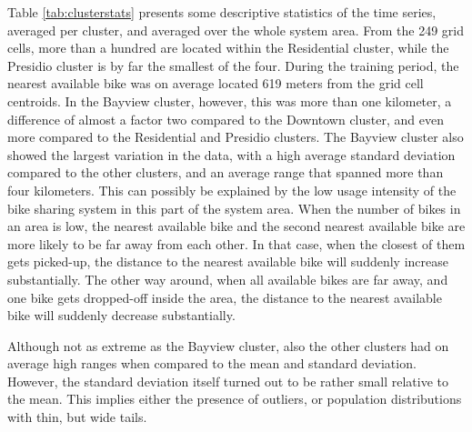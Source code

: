 \documentclass[12pt,oneside]{reedthesis}
\begin{document}
Table \ref{tab:clusterstats} presents some descriptive statistics of the
time series, averaged per cluster, and averaged over the whole system
area. From the 249 grid cells, more than a hundred are located within
the Residential cluster, while the Presidio cluster is by far the
smallest of the four. During the training period, the nearest available
bike was on average located 619 meters from the grid cell centroids. In
the Bayview cluster, however, this was more than one kilometer, a
difference of almost a factor two compared to the Downtown cluster, and
even more compared to the Residential and Presidio clusters. The Bayview
cluster also showed the largest variation in the data, with a high
average standard deviation compared to the other clusters, and an
average range that spanned more than four kilometers. This can possibly
be explained by the low usage intensity of the bike sharing system in
this part of the system area. When the number of bikes in an area is
low, the nearest available bike and the second nearest available bike
are more likely to be far away from each other. In that case, when the
closest of them gets picked-up, the distance to the nearest available
bike will suddenly increase substantially. The other way around, when
all available bikes are far away, and one bike gets dropped-off inside
the area, the distance to the nearest available bike will suddenly
decrease substantially.

Although not as extreme as the Bayview cluster, also the other clusters
had on average high ranges when compared to the mean and standard
deviation. However, the standard deviation itself turned out to be
rather small relative to the mean. This implies either the presence of
outliers, or population distributions with thin, but wide tails.
\end{document}
